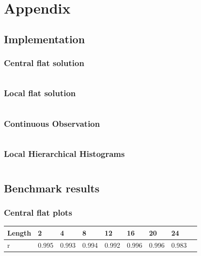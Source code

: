 \documentclass[11pt]{article}
\theoremstyle{definition}
\begin{document}
\section{Appendix}
\subsection{Implementation}\label{app:imp}
\subsubsection{Central flat solution}
\inputminted[fontsize=\footnotesize,linenos]{python}{py_files/cen_flat.py}
\subsubsection{Local flat solution}
\inputminted[fontsize=\footnotesize,linenos]{python}{py_files/flat_olh.py}
\subsubsection{Continuous Observation}
\inputminted[fontsize=\footnotesize,linenos]{python}{py_files/con_obs.py}
\subsubsection{Local Hierarchical Histograms}
\inputminted[fontsize=\footnotesize,linenos]{python}{py_files/local_hh_object.py}

\subsection{Benchmark results}

\subsubsection{Central flat plots}\label{app:cen_r}
\begin{table}[H]
\begin{tabular}{|l|l|l|l|l|l|l|l|l|}
\hline
Length & 2                   & 4 & 8 & 12 & 16 & 20 & 24 \\ \hline
r      & 0.995&0.993&0.994&0.992&0.996 & 0.996 & 0.983 \\ \hline
\end{tabular}
\end{table}
\end{document}
